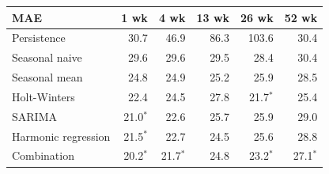 \begin{tabular}{|l|r|r|r|r|r|}
\hline
\textbf{MAE} & \textbf{1 wk} & \textbf{4 wk} & \textbf{13 wk} & \textbf{26 wk} & \textbf{52 wk} \\\hline
Persistence & 30.7 & 46.9 & 86.3 & 103.6 & 30.4 \\\hline
Seasonal naive & 29.6 & 29.6 & 29.5 & 28.4 & 30.4 \\\hline
Seasonal mean & 24.8 & 24.9 & 25.2 & 25.9 & 28.5 \\\hline
Holt-Winters & 22.4 & 24.5 & 27.8 & 21.7$^{*}$ & 25.4 \\\hline
SARIMA & 21.0$^{*}$ & 22.6 & 25.7 & 25.9 & 29.0 \\\hline
Harmonic regression & 21.5$^{*}$ & 22.7 & 24.5 & 25.6 & 28.8 \\\hline
Combination & 20.2$^{*}$ & 21.7$^{*}$ & 24.8 & 23.2$^{*}$ & 27.1$^{*}$ \\\hline
\end{tabular}
